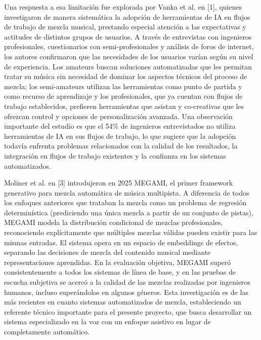 Una respuesta a esa limitación fue explorada por Vanka et al. en [1], quienes investigaron de manera sistemática la adopción de herramientas de IA en flujos de trabajo de mezcla musical, prestando especial atención a las expectativas y actitudes de distintos grupos de usuarios. A través de entrevistas con ingenieros profesionales, cuestionarios con semi-profesionales y análisis de foros de internet, los autores confirmaron que las necesidades de los usuarios varían según su nivel de experiencia. Los amateurs buscan soluciones automatizadas que les permitan tratar su música sin necesidad de dominar los aspectos técnicos del proceso de mezcla; los semi-amateurs utilizan las herramientas como punto de partida y como recurso de aprendizaje y los profesionales, que ya cuentan con flujos de trabajo establecidos, prefieren herramientas que asistan y co-creativas que les ofrezcan control y opciones de personalización avanzada. Una observación importante del estudio es que el 54\% de ingenieros entrevistados no utiliza herramientas de IA en sus flujos de trabajo, lo que sugiere que la adopción todavía enfrenta problemas relacionados con la calidad de los resultados, la integración en flujos de trabajo existentes y la confianza en los sistemas automatizados.

Moliner et al. en [3] introdujeron en 2025 MEGAMI, el primer framework generativo para mezcla automática de música multipista. A diferencia de todos los enfoques anteriores que trataban la mezcla como un problema de regresión determinística (prediciendo una única mezcla a partir de un conjunto de pistas), MEGAMI modela la distribución condicional de mezclas profesionales, reconociendo explícitamente que múltiples mezclas válidas pueden existir para las mismas entradas. El sistema opera en un espacio de embeddings de efectos, separando las decisiones de mezcla del contenido musical mediante representaciones aprendidas. En la evaluación objetiva, MEGAMI superó consistentemente a todos los sistemas de línea de base, y en las pruebas de escucha subjetiva se acercó a la calidad de las mezclas realizadas por ingenieros humanos, incluso superándolos en algunos géneros. Esta investigación es de las más recientes en cuanto sistemas automatizados de mezcla, estableciendo un referente técnico importante para el presente proyecto, que busca desarrollar un sistema especializado en la voz con un enfoque asistivo en lugar de completamente automático.

